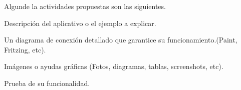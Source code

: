 
Algun\@s de la actividades propuestas son las siguientes.
\item Descripción del aplicativo o el ejemplo a explicar.
\item Un diagrama de conexión detallado que garantice su funcionamiento.(Paint, Fritzing, etc).
\item Imágenes o ayudas gráficas (Fotos, diagramas, tablas, screenshots, etc).
\item Prueba de su funcionalidad.
